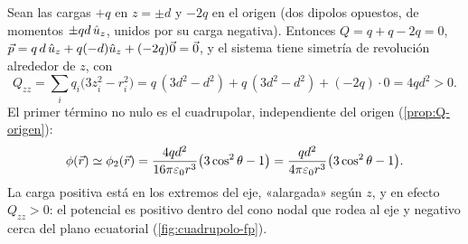 

\begin{ejemplo}\label{ej:cuadrupolo-lineal}
Sean las cargas $+q$ en $z=\pm d$ y $-2q$ en el origen (dos dipolos opuestos, de momentos $\pm qd\,\hat{u}_{z}$, unidos por su carga negativa). Entonces
$Q=q+q-2q=0$, $\vec{p}=q\,d\,\hat{u}_{z}+q(-d)\hat{u}_{z}+(-2q)\vec{0}=\vec{0}$, y el sistema tiene simetría de revolución alrededor de $z$, con
\[
  Q_{zz}=\sum_iq_i\bigl(3z_i^{2}-r_i^{2}\bigr)=q\,(3d^{2}-d^{2})+q\,(3d^{2}-d^{2})+(-2q)\cdot0=4qd^{2}>0 .
\]
El primer término no nulo es el cuadrupolar, independiente del origen (\cref{prop:Q-origen}):
\[
  \phi(\vec{r})\simeq\phi_{2}(\vec{r})=\frac{4qd^{2}}{16\pi\varepsilon_{0} r^{3}}\bigl(3\cos^{2}\theta-1\bigr)=\frac{qd^{2}}{4\pi\varepsilon_{0} r^{3}}\bigl(3\cos^{2}\theta-1\bigr).
\]
La carga positiva está en los extremos del eje, «alargada» según $z$, y en efecto $Q_{zz}>0$: el potencial es positivo dentro del cono nodal que rodea al eje y
negativo cerca del plano ecuatorial (\cref{fig:cuadrupolo-fp}).
\end{ejemplo}



